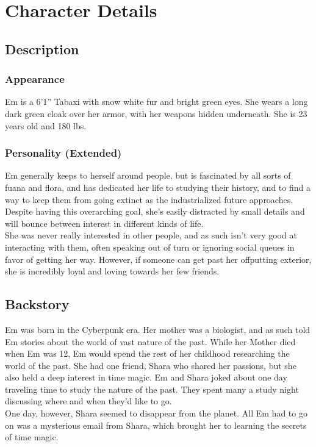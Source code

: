 \documentclass[a4paper,openany,twocolumn]{book}
\begin{document}
\onecolumn






\restoregeometry
\twocolumn

\chapter*{Character Details}

\section*{Description}
\subsection*{Appearance}
Em is a 6'1'' Tabaxi with snow white fur and bright green eyes. She wears
a long dark green cloak over her armor, with her weapons hidden underneath. She
is 23 years old and 180 lbs.
\subsection*{Personality (Extended)}
Em generally keeps to herself around people, but is fascinated by all sorts of
fuana and flora, and has dedicated her life to studying their history, and to
find a way to keep them from going extinct as the industrialized future
approaches. Despite having this overarching goal, she's easily distracted by
small details and will bounce between interest in different kinds of life. \\
She was never really interested in other people, and as such isn't very good at
interacting with them, often speaking out of turn or ignoring social queues in
favor of getting her way. However, if someone can get past her offputting
exterior, she is incredibly loyal and loving towards her few friends.
\columnbreak
\section*{Backstory}
Em was born in the Cyberpunk era. Her mother was a biologist, and as such told
Em stories about the world of vast nature of the past. While her Mother died
when Em was 12, Em would spend the rest of her childhood researching the world
of the past. She had one friend, Shara who shared her passions, but she also
held a deep interest in time magic. Em and Shara joked about one day traveling
time to study the nature of the past. They spent many a study night discussing
where and when they'd like to go. \\ One day, however, Shara seemed to disappear
from the planet. All Em had to go on was a mysterious email from Shara, which
brought her to learning the secrets of time magic.
\end{document}

